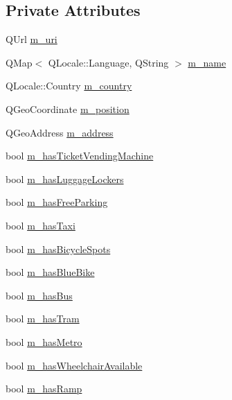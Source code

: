 \subsection*{Private Attributes}
\begin{DoxyCompactItemize}
\item 
Q\+Url \mbox{\hyperlink{classCSA_1_1Station_a01e636d3257400f9748ed7060333990c}{m\+\_\+uri}}
\item 
Q\+Map$<$ Q\+Locale\+::\+Language, Q\+String $>$ \mbox{\hyperlink{classCSA_1_1Station_ac4f2d9d4a144e62b1a16cb3ecea57730}{m\+\_\+name}}
\item 
Q\+Locale\+::\+Country \mbox{\hyperlink{classCSA_1_1Station_afe87600b50102ea34f95a6af2cb123a3}{m\+\_\+country}}
\item 
Q\+Geo\+Coordinate \mbox{\hyperlink{classCSA_1_1Station_ae8f2de64fc98f099e23e0bf8cb117dc0}{m\+\_\+position}}
\item 
Q\+Geo\+Address \mbox{\hyperlink{classCSA_1_1Station_aa62d0b53ab56f702aa036fe36224e717}{m\+\_\+address}}
\item 
bool \mbox{\hyperlink{classCSA_1_1Station_a8da1484b9982379a0b8e07a4331aa1ec}{m\+\_\+has\+Ticket\+Vending\+Machine}}
\item 
bool \mbox{\hyperlink{classCSA_1_1Station_a21ecc0f7cdc71ab5c15bb8fc922b0a8a}{m\+\_\+has\+Luggage\+Lockers}}
\item 
bool \mbox{\hyperlink{classCSA_1_1Station_afc34176857b787cf3a1337d90fd21232}{m\+\_\+has\+Free\+Parking}}
\item 
bool \mbox{\hyperlink{classCSA_1_1Station_a165c04ccc0072c11a1dab515f8e82aa9}{m\+\_\+has\+Taxi}}
\item 
bool \mbox{\hyperlink{classCSA_1_1Station_a696c72ddd3115794f253cfda5c7fbd06}{m\+\_\+has\+Bicycle\+Spots}}
\item 
bool \mbox{\hyperlink{classCSA_1_1Station_af89e446a2cadd47a70ff85d4a1605476}{m\+\_\+has\+Blue\+Bike}}
\item 
bool \mbox{\hyperlink{classCSA_1_1Station_a657f9381af7d972fb0a256a2bd7f7c38}{m\+\_\+has\+Bus}}
\item 
bool \mbox{\hyperlink{classCSA_1_1Station_aec86731656727f5395da624ae51f47dc}{m\+\_\+has\+Tram}}
\item 
bool \mbox{\hyperlink{classCSA_1_1Station_a591ebe8b8f8ff846e364b96e98cabc9f}{m\+\_\+has\+Metro}}
\item 
bool \mbox{\hyperlink{classCSA_1_1Station_a918ff279b54d1b4ff72a68949089a521}{m\+\_\+has\+Wheelchair\+Available}}
\item 
bool \mbox{\hyperlink{classCSA_1_1Station_aa192bc17d3e887e98a2f3499e4cdc7c7}{m\+\_\+has\+Ramp}}

\end{DoxyCompactItemize}
